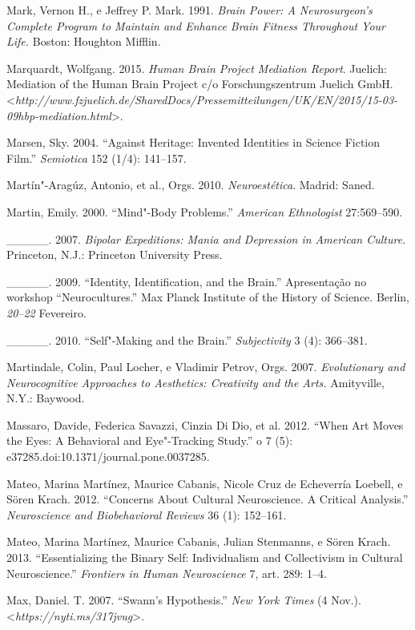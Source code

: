 {\begin{Parskip}
Mark, Vernon H., e Jeffrey P. Mark. 1991. \emph{Brain Power: A
Neurosurgeon's Complete Program to Maintain and Enhance Brain Fitness
Throughout Your Life.} Boston: Houghton Mifflin.

Marquardt, Wolfgang. 2015. \emph{Human Brain Project Mediation Report}.
Juelich: Mediation of the Human Brain Project c/o Forschungszentrum
Juelich GmbH.
\textless{}\emph{http://www.fzjuelich.de/SharedDocs/Pressemitteilungen/UK/EN/2015/15-03-09hbp-mediation.html}\textgreater{}.

Marsen, Sky. 2004. ``Against Heritage: Invented Identities in Science
Fiction Film.'' \emph{Semiotica} 152 (1/4): 141--157.

Martín"-Aragúz, Antonio, et al., Orgs. 2010. \emph{Neuroestética}.
Madrid: Saned.

Martin, Emily. 2000. ``Mind"-Body Problems.'' \emph{American Ethnologist}
27:569--590.

\_\_\_\_\_. 2007. \emph{Bipolar Expeditions: Mania and Depression in
American Culture.} Princeton, N.J.: Princeton University Press.

\_\_\_\_\_. 2009. ``Identity, Identification, and the Brain.''
Apresentação no workshop ``Neurocultures.'' Max Planck Institute of the
History of Science. Berlin, \emph{20--22} Fevereiro.

\_\_\_\_\_. 2010. ``Self"-Making and the Brain.'' \emph{Subjectivity} 3
(4): 366--381.

Martindale, Colin, Paul Locher, e Vladimir Petrov, Orgs. 2007.
\emph{Evolutionary and Neurocognitive Approaches to Aesthetics:
Creativity and the Arts.} Amityville, N.Y.: Baywood.

Massaro, Davide, Federica Savazzi, Cinzia Di Dio, et al. 2012. ``When
Art Moves the Eyes: A Behavioral and Eye"-Tracking Study.'' o 7
(5): e37285.doi:10.1371/journal.pone.0037285.

Mateo, Marina Martínez, Maurice Cabanis, Nicole Cruz de Echeverría
Loebell, e Sören Krach. 2012. ``Concerns About Cultural Neuroscience. A
Critical Analysis.'' \emph{Neuroscience and Biobehavioral Reviews} 36
(1): 152--161.

Mateo, Marina Martínez, Maurice Cabanis, Julian Stenmanns, e Sören
Krach. 2013. ``Essentializing the Binary Self: Individualism and
Collectivism in Cultural Neuroscience.'' \emph{Frontiers in Human
Neuroscience} 7, art. 289: 1--4.

Max, Daniel. T. 2007. ``Swann's Hypothesis.'' \emph{New York Times} (4
Nov.).
\textless{}\emph{https://nyti.ms/317jvug}\textgreater{}.


\end{Parskip}}
